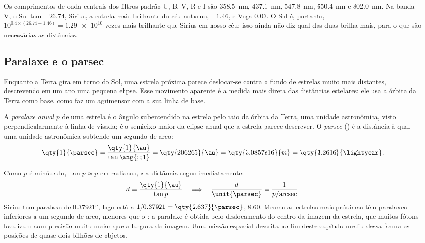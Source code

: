 Os comprimentos de onda centrais dos filtros padrão U, B, V, R e I são \qty{358.5}{nm}, \qty{437.1}{nm}, \qty{547.8}{nm}, \qty{650.4}{nm} e
\qty{802.0}{nm}.
Na banda V, o Sol tem  $-26.74$, Sirius, a estrela mais brilhante do céu noturno, $-1.46$, e Vega $0.03$. O Sol é, portanto, $10^{0.4\times(26.74 - 1.46)} = \num{1.29e10}$ vezes mais brilhante que Sirius em nosso céu; isso ainda não diz qual das duas brilha mais, para o que são necessárias as distâncias.

\subsection*{Paralaxe e o parsec}

Enquanto a Terra gira em torno do Sol, uma estrela próxima parece deslocar-se contra o fundo de estrelas muito mais distantes, descrevendo em um ano uma pequena elipse. Esse movimento aparente é a medida mais direta das distâncias estelares: ele usa a órbita da Terra como base, como faz um agrimensor com a sua linha de base.

\begin{definition}\label{def:b1:observing-the-sky:parallax}
A \emph{paralaxe anual} $p$ de uma estrela é o ângulo subentendido na estrela pelo raio da órbita da Terra, uma unidade astronômica, visto perpendicularmente à linha de visada; é o semieixo maior da elipse anual que a estrela parece descrever. O \emph{parsec} (\unit{\parsec}) é a distância à qual uma unidade astronômica subtende um segundo de arco:
\[
  \qty{1}{\parsec} = \frac{\qty{1}{\au}}{\tan\ang{;;1}} = \qty{206265}{\au}
  = \qty{3.0857e16}{m} = \qty{3.2616}{\lightyear} .
\]
\end{definition}

Como $p$ é minúsculo, $\tan p \approx p$ em radianos, e a distância segue imediatamente:
\[
  d = \frac{\qty{1}{\au}}{\tan p} \quad\Longrightarrow\quad
  \frac{d}{\unit{\parsec}} = \frac{1}{p/\text{arcsec}} .
\]
Sirius tem paralaxe de \ang{;;0.37921}, logo está a $1/0.37921 =
\qty{2.637}{\parsec}$, \qty{8.60}{\lightyear}. Mesmo as estrelas mais próximas têm paralaxes inferiores a um segundo de arco, menores que o : a paralaxe é obtida pelo deslocamento do centro da imagem da estrela, que muitos fótons localizam com precisão muito maior que a largura da imagem. Uma missão espacial descrita no fim deste capítulo mediu dessa forma as posições de quase dois bilhões de objetos.

